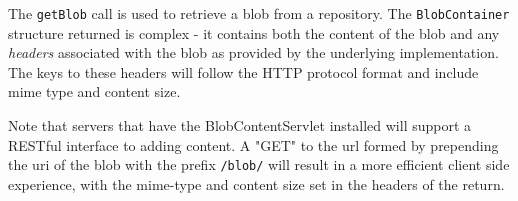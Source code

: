 The \verb+getBlob+ call is used to retrieve a blob from a repository. The \verb+BlobContainer+ structure
returned is complex - it contains both the content of the blob and any \emph{headers} associated with the
blob as provided by the underlying implementation. The keys to these headers will follow the HTTP protocol format and
include mime type and content size.

Note that \Rapture servers that have the BlobContentServlet installed will support a RESTful interface
to adding content. A "GET" to the url formed by prepending the uri of the blob with the prefix
\verb+/blob/+ will result in a more efficient client side experience, with the mime-type and content size
set in the headers of the return.
